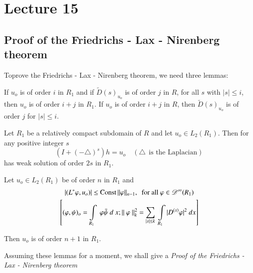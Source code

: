 \chapter{Lecture 15}\label{chap15}%

\section{Proof of the Friedrichs - Lax - Nirenberg theorem}\label{chap15:sec1}

To\pageoriginale prove the Friedrichs - Lax - Nirenberg theorem, we need three lemmas:
\begin{Lemma}\label{chap15:sec1:lem1}%
 If $u_o$ is of order $i$ in $R_1$ and if $\tilde{D}(s)_{u_o}$ is of
 order $j$ in $R$, for all $s$ with $|s| \le i$, then $u_o$ is of
 order $i + j$ in $R_1$. If $u_o$ is of order $i + j$ in $R$, then
 $\tilde{D}(s)_{u_o}$ is of order $j$ for $|s|\le i$. 
\end{Lemma}

\begin{Lemma}\label{chap15:sec1:lem2}%
 Let $R_1$ be a relatively compact subdomain of $R$ and let $u_o \in
 L_2 (R_1)$. Then for any positive integer $s$ 
 $$
 (I + (-\triangle)^s)h = u_o \quad (\triangle~~ \text{is the Laplacian})
 $$
 has weak solution of order $2s$ in $R_1$.
\end{Lemma}

\begin{Lemma}\label{chap15:sec1:lem3}%
 Let $u_o \in L_2(R_1)$ be of order $n$ in $R_1$ and 
 \begin{gather*}
  | (L^* \varphi, u_o) | \le \operatorname{Const} || \varphi ||_{n-1},
  ~\text{ for all}~ \varphi \in \mathscr{D}^\infty (R_1) \\ 
  \left[(\varphi,\psi)_o = \int\limits_{R_1} ~ \varphi \bar{\psi} ~ d ~ x
   ; || ~ \varphi ~ ||^2_k = \sum_{|s|\le k} ~ \int\limits_{R_1} |
   D^{(s)}\varphi |^2 ~dx \right] 
 \end{gather*}
\end{Lemma}

Then $u_o$ is of order $n + 1$ in $R_1$.

Assuming these lemmas for a moment, we shall give a 
\textit{Proof of the Friedrichs - Lax - Nirenberg theorem}

